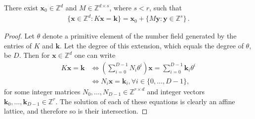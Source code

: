 \begin{proposition}
There exist $\boldsymbol{x}_{0} \in \mathbb{Z}^{d}$ and
$M \in \mathbb{Z}^{d \times s}$, where $s < r$, such that
\begin{align*}
  \{ \boldsymbol{x}\in\mathbb{Z}^d : K\boldsymbol{x} =
  \boldsymbol{k} \} =
  \boldsymbol{x}_{0} + \{ M \boldsymbol{y} : \boldsymbol{y} \in \mathbb{Z}^s \} \, .
\end{align*}
\end{proposition}

\begin{proof}
  Let $\theta$ denote a primitive element of the number field
  generated by the entries of $K$ and $\boldsymbol{k}$. Let the degree
  of this extension, which equals the degree of $\theta$, be
  $D$. Then for $\boldsymbol{x} \in \mathbb{Z}^d$ one can write
\begin{align*}
K \boldsymbol{x} = \boldsymbol{k} &\Leftrightarrow \left( \sum \limits_{i=0}^{D-1} N_{i} \theta^{i} \right) \boldsymbol{x} = \sum \limits_{i=0}^{D-1} \boldsymbol{k}_{i} \theta^{i} \\
&\Leftrightarrow N_{i} \boldsymbol{x} = \boldsymbol{k}_{i}, \forall i \in \lbrace 0, \ldots, D-1 \rbrace ,
\end{align*}
for some integer matrices
$N_{0}, \ldots, N_{D-1} \in \mathbb{Z}^{r \times d}$ and integer
vectors
$\boldsymbol{k}_{0}, \ldots, \boldsymbol{k}_{D-1} \in \mathbb{Z}^{r}$.
The solution of each of these equations is clearly an affine lattice, and
therefore so is their intersection.
\end{proof}
